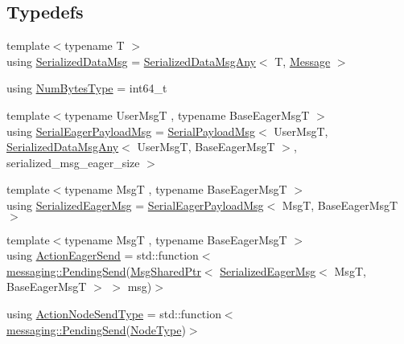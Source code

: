 \subsection*{Typedefs}
\begin{DoxyCompactItemize}
\item 
{\footnotesize template$<$typename T $>$ }\\using \hyperlink{namespacevt_1_1serialization_a56d2aee859dc963c2b5fad82649dd79a}{Serialized\+Data\+Msg} = \hyperlink{structvt_1_1serialization_1_1_serialized_data_msg_any}{Serialized\+Data\+Msg\+Any}$<$ T, \hyperlink{namespacevt_a3a3ddfef40b4c90915fa43cdd5f129ea}{Message} $>$
\item 
using \hyperlink{namespacevt_1_1serialization_aaa03b9b407ed5776043c163629312e40}{Num\+Bytes\+Type} = int64\+\_\+t
\item 
{\footnotesize template$<$typename User\+MsgT , typename Base\+Eager\+MsgT $>$ }\\using \hyperlink{namespacevt_1_1serialization_af3a0dfd4a0d3fa09c75edba0dc1b7fec}{Serial\+Eager\+Payload\+Msg} = \hyperlink{structvt_1_1serialization_1_1_serial_payload_msg}{Serial\+Payload\+Msg}$<$ User\+MsgT, \hyperlink{structvt_1_1serialization_1_1_serialized_data_msg_any}{Serialized\+Data\+Msg\+Any}$<$ User\+MsgT, Base\+Eager\+MsgT $>$, serialized\+\_\+msg\+\_\+eager\+\_\+size $>$
\item 
{\footnotesize template$<$typename MsgT , typename Base\+Eager\+MsgT $>$ }\\using \hyperlink{namespacevt_1_1serialization_ac8b37425f8316a800cdb0b0f0f8a6438}{Serialized\+Eager\+Msg} = \hyperlink{namespacevt_1_1serialization_af3a0dfd4a0d3fa09c75edba0dc1b7fec}{Serial\+Eager\+Payload\+Msg}$<$ MsgT, Base\+Eager\+MsgT $>$
\item 
{\footnotesize template$<$typename MsgT , typename Base\+Eager\+MsgT $>$ }\\using \hyperlink{namespacevt_1_1serialization_a009aa1de8d42a3c97643b947fcc6f0b6}{Action\+Eager\+Send} = std\+::function$<$ \hyperlink{structvt_1_1messaging_1_1_pending_send}{messaging\+::\+Pending\+Send}(\hyperlink{namespacevt_ab2b3d506ec8e8d1540aede826d84a239}{Msg\+Shared\+Ptr}$<$ \hyperlink{namespacevt_1_1serialization_ac8b37425f8316a800cdb0b0f0f8a6438}{Serialized\+Eager\+Msg}$<$ MsgT, Base\+Eager\+MsgT $>$ $>$ msg)$>$
\item 
using \hyperlink{namespacevt_1_1serialization_ad4f189ca4817d31b73436c92bca55deb}{Action\+Node\+Send\+Type} = std\+::function$<$ \hyperlink{structvt_1_1messaging_1_1_pending_send}{messaging\+::\+Pending\+Send}(\hyperlink{namespacevt_a866da9d0efc19c0a1ce79e9e492f47e2}{Node\+Type})$>$

\end{DoxyCompactItemize}
